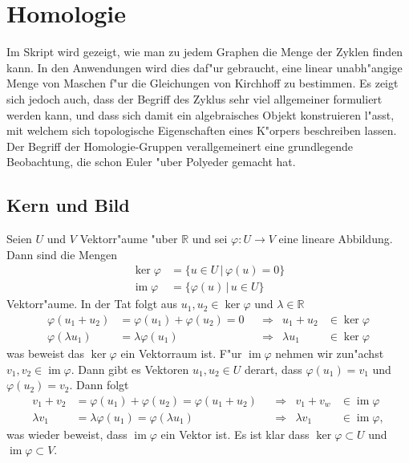 %
%
%
\chapter{Homologie%
\label{chapter:homologie}}
Im Skript wird gezeigt, wie man zu jedem Graphen die Menge der Zyklen
finden kann.
In den Anwendungen wird dies daf"ur gebraucht, eine linear unabh"angige
Menge von Maschen f"ur die Gleichungen von Kirchhoff zu bestimmen.
Es zeigt sich jedoch auch, dass der Begriff des Zyklus sehr viel
allgemeiner formuliert werden kann, und dass sich damit ein algebraisches
Objekt konstruieren l"asst, mit welchem sich topologische Eigenschaften
eines K"orpers beschreiben lassen.
Der Begriff der Homologie-Gruppen verallgemeinert eine grundlegende
Beobachtung, die schon Euler "uber Polyeder gemacht hat.

\section{Kern und Bild}
Seien $U$ und $V$ Vektorr"aume "uber $\mathbb R$ und sei $\varphi\colon U\to V$
eine lineare Abbildung.
Dann sind die Mengen
\begin{align*}
\operatorname{ker}\varphi&=\{u\in U\,|\, \varphi(u) = 0\}
\\
\operatorname{im}\varphi&=\{\varphi(u)\,|\, u\in U\}
\end{align*}
Vektorr"aume.
In der Tat folgt aus $u_1,u_2\in\operatorname{ker}\varphi$
und $\lambda\in\mathbb R$
\begin{align*}
\varphi(u_1+u_2)&=\varphi(u_1)+\varphi(u_2) = 0
&
&\Rightarrow&
u_1+u_2&\in\operatorname{ker}\varphi
\\
\varphi(\lambda u_1)&=\lambda\varphi(u_1)
&
&\Rightarrow&
\lambda u_1&\in\operatorname{ker}\varphi
\end{align*}
was beweist das $\operatorname{ker}\varphi$ ein Vektorraum ist.
F"ur $\operatorname{im}\varphi$ nehmen wir zun"achst
$v_1,v_2\in\operatorname{im}\varphi$.
Dann gibt es Vektoren $u_1,u_2\in U$ derart, dass
$\varphi(u_1)=v_1$ und $\varphi(u_2)=v_2$.
Dann folgt
\begin{align*}
v_1+v_2&=\varphi(u_1)+\varphi(u_2)=\varphi(u_1+u_2)
&
&\Rightarrow&
v_1+v_w&\in\operatorname{im}\varphi
\\
\lambda v_1&=\lambda\varphi(u_1)=\varphi(\lambda u_1)
&
&\Rightarrow&
\lambda v_1&\in\operatorname{im}\varphi,
\end{align*}
was wieder beweist, dass $\operatorname{im}\varphi$ ein Vektor ist.
Es ist klar dass $\operatorname{ker}\varphi\subset U$ und
$\operatorname{im}\varphi\subset V$.

